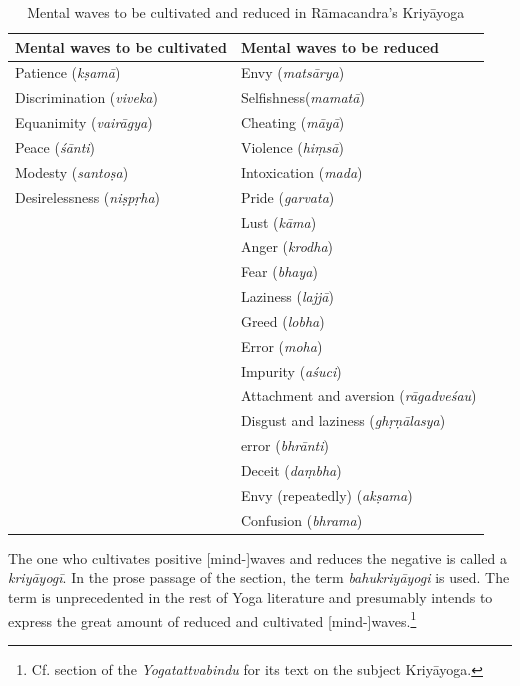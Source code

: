 \begin{table}[H]
    \centering
    \begin{tabularx}{\textwidth}{XX}
        \toprule
        \textbf{Mental waves to be cultivated} & \textbf{Mental waves to be reduced} \\
        \midrule
        Patience (\textit{kṣamā}) & Envy (\textit{matsārya}) \\
        Discrimination (\textit{viveka}) & Selfishness(\textit{mamatā})\\
        Equanimity (\textit{vairāgya}) & Cheating (\textit{māyā})\\
        Peace (\textit{śānti}) & Violence (\textit{hiṃsā})\\
        Modesty (\textit{santoṣa}) & Intoxication (\textit{mada})\\
        Desirelessness (\textit{niṣpṛha}) & Pride (\textit{garvata})\\
        & Lust (\textit{kāma}) \\
        & Anger (\textit{krodha}) \\
        & Fear (\textit{bhaya})\\
        & Laziness (\textit{lajjā})\\
        & Greed (\textit{lobha})\\
        & Error (\textit{moha})\\
        & Impurity (\textit{aśuci})\\
        & Attachment and aversion (\textit{rāgadveśau}) \\
        & Disgust and laziness (\textit{ghṛṇālasya})\\
        & error (\textit{bhrānti})\\
        & Deceit (\textit{daṃbha})\\
        & Envy (repeatedly) (\textit{akṣama})\\
        & Confusion (\textit{bhrama})\\
        \bottomrule
    \end{tabularx}
    \caption{Mental waves to be cultivated and reduced in Rāmacandra's Kriyāyoga}
    \label{tab:waves}
\end{table}

The one who cultivates positive [mind-]waves and reduces the negative is called a \textit{kriyāyogī}. In the prose passage of the section, the term \textit{bahukriyāyogi} is used. The term is unprecedented in the rest of Yoga literature and presumably intends to express the great amount of reduced and cultivated [mind-]waves.\footnote{Cf. section  of the \textit{Yogatattvabindu} for its text on the subject Kriyāyoga.} 

